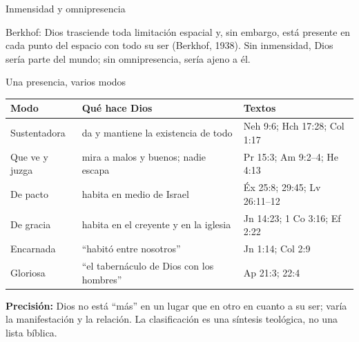 \documentclass[hyperref={bookmarks=false},aspectratio=169]{beamer}
\newcommand{\precision}[1]{{\footnotesize\color{gris}\textbf{Precisión:} #1}}
\begin{document}
\begin{frame}{Inmensidad y omnipresencia}
\centering
{}\par\medskip
\small\RaggedRight Berkhof: Dios trasciende toda limitación espacial y, sin embargo, está presente en cada punto del espacio con todo su ser (Berkhof, 1938). Sin inmensidad, Dios sería parte del mundo; sin omnipresencia, sería ajeno a él.
\end{frame}

\begin{frame}{Una presencia, varios modos}
\scriptsize\renewcommand{\arraystretch}{1.15}
\begin{tabular}{@{}>{\RaggedRight\arraybackslash}p{2.2cm}>{\RaggedRight\arraybackslash}p{5.4cm}>{\RaggedRight\arraybackslash}p{4.2cm}@{}}
\toprule
\textbf{Modo} & \textbf{Qué hace Dios} & \textbf{Textos} \\ \midrule
Sustentadora & da y mantiene la existencia de todo & Neh 9:6; Hch 17:28; Col 1:17 \\
Que ve y juzga & mira a malos y buenos; nadie escapa & Pr 15:3; Am 9:2--4; He 4:13 \\
De pacto & habita en medio de Israel & Éx 25:8; 29:45; Lv 26:11--12 \\
De gracia & habita en el creyente y en la iglesia & Jn 14:23; 1 Co 3:16; Ef 2:22 \\
Encarnada & ``habitó entre nosotros'' & Jn 1:14; Col 2:9 \\
Gloriosa & ``el tabernáculo de Dios con los hombres'' & Ap 21:3; 22:4 \\
\bottomrule
\end{tabular}\par\medskip
\precision{Dios no está ``más'' en un lugar que en otro en cuanto a su ser; varía la manifestación y la relación. La clasificación es una síntesis teológica, no una lista bíblica.}
\end{frame}
\end{document}
